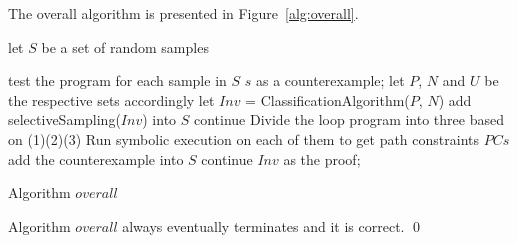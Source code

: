  
The overall algorithm is presented in Figure~\ref{alg:overall}.
\begin{algorithm}[t]
\SetAlgoVlined
\Indm
{}
\Indp
let $S$ be a set of random samples\;
 {
    test the program for each sample in $S$\;
     {
        \Return $s$ as a counterexample;
    }
    let $P$, $N$ and $U$ be the respective sets accordingly\;
    let $Inv$ = ClassificationAlgorithm($P$, $N$)\;
     {
        add selectiveSampling($Inv$) into $S$\;
        continue\;
    }
    Divide the loop program into three based on (1)(2)(3)\;
    Run symbolic execution on each of them to get path constraints $PCs$\;
     {
         {
            add the counterexample into $S$\;
            continue\;
        }
    }
    \Return $Inv$ as the proof;
    
}
\caption{Algorithm $overall$}
\label{alg:overall}
\end{algorithm}


\begin{example}
\end{example}


\begin{theorem}
Algorithm $overall$ always eventually terminates and it is correct. \hfill \qed
\end{theorem}


